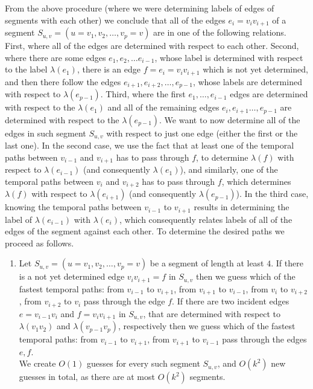\documentclass[a4paper,UKenglish,cleveref, autoref, thm-restate]{lipics-v2021}
\newcounter{guesscounter}
\begin{document}
From the above procedure (where we were determining labels of edges of segments with each other) 
we conclude that all of the edges $e_i=v_i v_{i+1}$ of a segment $S_{u,v}=(u=v_1, v_2, \dots, v_p=v)$ are in one of the following relations.
First, where all of the edges are determined with respect to each other.
Second, where
there are some edges $e_1, e_2, \dots e_{i-1}$, whose label is determined with respect to the label $\lambda(e_1)$, there is an edge $f = e_i = v_i v_{i+1}$ which is not yet determined,
and then there follow the edges
$e_{i+1}, e_{i+2}, \dots, e_{p-1}$, whose labels are determined with respect to $\lambda(e_{p-1})$.
Third, where the first $e_1, \dots, e_{i-1}$ edges are determined with respect to the $\lambda(e_1)$ and all of the remaining edges $e_i, e_{i+1} \dots, e_{p-1}$ are determined with respect to the $\lambda(e_{p-1})$.
%
We want to now determine all of the edges in such segment $S_{u,v}$ with respect to just one edge (either the first or the last one).
In the second case, we use the fact that at least one of the temporal paths between $v_{i-1}$ and $v_{i+1}$ has to pass through $f$, to determine $\lambda(f)$ with respect to $\lambda(e_{i-1})$ (and consequently $\lambda(e_1)$),
and similarly, one of the temporal paths between $v_{i}$ and $v_{i+2}$ has to pass through $f$, which determines $\lambda(f)$ with respect to $\lambda(e_{i+1})$ (and consequently $\lambda(e_{p-1})$).
In the third case, knowing the temporal paths between $v_{i-1}$ to $v_{i+1}$ results in determining the label of $\lambda(e_{i-1})$ with $\lambda(e_i)$, which consequently relates labels of all of the edges of the segment against each other.
%
To determine the desired paths we proceed as follows.
\begin{enumerate}[G-1.]
    \setcounter{enumi}{\value{guesscounter}}
    \item \label{FPT-guessFTPinSegmentTgroughEdge}
    Let $S_{u,v} = (u=v_1, v_2, \dots, v_p=v)$  be a segment of length at least $4$.
    If there is a not yet determined edge $v_i v_{i+1} = f$ in $S_{u,v}$ then
    we guess which of the fastest temporal paths: from $v_{i-1}$ to $v_{i+1}$, from $v_{i+1}$ to $v_{i-1}$, from $v_{i}$ to $v_{i+2}$, from $v_{i+2}$ to $v_{i}$ pass through the edge $f$. 
    If there are two incident edges $e = v_{i-1} v_{i}$ and $f = v_i v_{i+1} $ in $S_{u,v}$, that are determined with respect to $\lambda(v_1 v_2)$ and $\lambda (v_{p-1} v_p)$, respectively then we guess which of the fastest temporal paths: from $v_{i-1}$ to $v_{i+1}$, from $v_{i+1}$ to $v_{i-1}$ pass through the edges $e,f$. \\
    We create $O(1)$ guesses for every such segment $S_{u,v}$, and $O(k^2)$ new guesses in total, as there are at most $O(k^2)$ segments.
    \setcounter{guesscounter}{\value{enumi}}
\end{enumerate}
\end{document}
